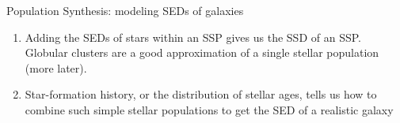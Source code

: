 \documentclass[letterpaper,landscape]{slides}
\begin{document}
\begin{slide}
{\begin{minipage}[t]{13cm}
\begin{center}
				
			\end{center}
		\end{minipage}
		
		\begin{minipage}[t]{11cm}
			\begin{center}
				\vskip -1in
				{\large \color{red} Population Synthesis: modeling SEDs of galaxies }
			\end{center}
			
			
			\begin{enumerate}
				\item Adding the SEDs of stars within an SSP gives us the SSD of an SSP.
				Globular clusters are a good approximation of a single stellar population (more later).
				\item {\color{blue} Star-formation history}, or the distribution of stellar ages,
				tells us how to combine such simple stellar populations to get the SED of a realistic
				galaxy
			\end{enumerate}
			
	\end{minipage}}
	\vfill 
\end{slide}
\end{document}
